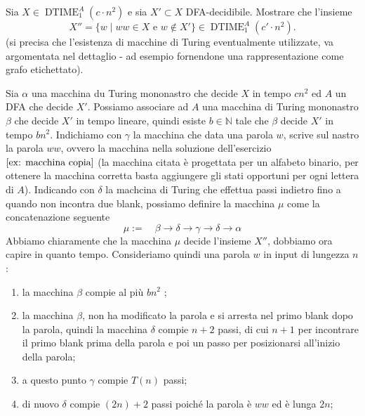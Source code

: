 \begin{ex}
{Sia $X \in \operatorname{DTIME}_1^A(c \cdot n^2)$ e sia $X' \subset X$ DFA-decidibile.}
{Mostrare che l'insieme}
\[
X'' = \{ w \mid ww \in X \text{ e } w \notin X' \} \in \operatorname{DTIME}_1^A(c' \cdot n^2).
\]
{(si precisa che l'esistenza di macchine di Turing eventualmente utilizzate, va argomentata nel dettaglio - ad esempio fornendone una rappresentazione come grafo etichettato).}
\end{ex}
\begin{sol}
    Sia $\alpha$ una macchina du Turing mononastro
    che decide $X$ in tempo $cn^2$ ed $A$
    un DFA che decide $X'$.
    Possiamo associare ad $A$
    una macchina di Turing mononastro
    $\beta$ che decide $X'$ in tempo lineare,
    quindi esiste $b\in \mathbb N$ tale che
    $\beta $ decide $X'$
    in tempo $bn^2$.
    Indichiamo con $\gamma$
    la macchina che data una parola $w$,
    scrive sul nastro la parola $ww$,
    ovvero la macchina nella soluzione dell'esercizio 
    $\ref{ex: macchina copia}$ (la macchina citata è progettata per un alfabeto binario, per ottenere
    la macchina corretta basta aggiungere gli stati opportuni per ogni lettera di $A$).
    Indicando con $\delta$
    la machcina di Turing che
    effettua passi indietro
    fino a quando non incontra due blank,
    possiamo definire la macchina $\mu$
    come la concatenazione seguente
    \[
    \mu:= \quad \beta
    \to \delta \to \gamma \to \delta \to \alpha 
    \]
    Abbiamo chiaramente che la macchina $\mu$
    decide l'insieme $X''$, dobbiamo ora capire in quanto tempo.
    Consideriamo quindi
    una parola $w$ 
    in input di lungezza 
    $n$:
    \begin{enumerate}
        \item 
    la macchina $\beta$ compie
    al più $bn^2$ ;

    \item la macchina $\beta$,
    non ha modificato 
    la parola e si arresta nel primo 
    blank dopo la parola,
    quindi la macchina $\delta$ compie $n+2$ passi,
    di cui $n+1$ per incontrare il primo blank prima della parola
    e poi un passo per posizionarsi all'inizio della parola;

    \item a questo punto $\gamma$ compie $T(n)$ passi;
    
    \item di nuovo $\delta$ compie $(2n) +2$ passi poiché
    la parola è $ww$ ed è lunga $2n$;


\end{enumerate}
\end{sol}
